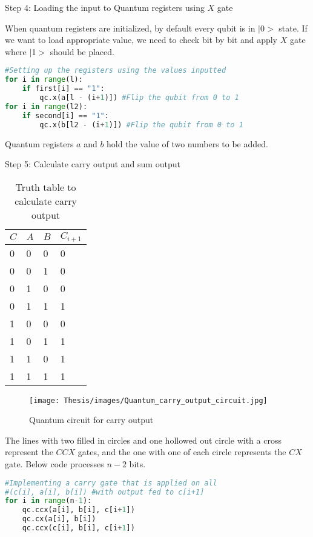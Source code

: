 \documentclass{cpp}
\begin{document}
\newpage
Step 4: Loading the input to Quantum registers using $X$ gate

When quantum registers are initialized, by default every qubit is in $|$0$>$ state. If we want to load appropriate value, we need to check bit by bit and apply $X$ gate where $|$1$>$ should be placed. 

\begin{lstlisting}[language=Python]
#Setting up the registers using the values inputted
for i in range(l):
    if first[i] == "1":
        qc.x(a[l - (i+1)]) #Flip the qubit from 0 to 1
for i in range(l2):
    if second[i] == "1":
        qc.x(b[l2 - (i+1)]) #Flip the qubit from 0 to 1
\end{lstlisting}

Quantum registers $a$ and $b$ hold the value of two numbers to be added. 

Step 5: Calculate carry output and sum output

\begin{table}[h]
\centering
\caption{Truth table to calculate carry output}
\begin{tabular}{llll}
\hline
$C$ &
$A$ &
$B$ &
$C_{i+1}$ \\
\hline
0 &
0 &
0 &
0 \\
0 &
0 &
1 &
0 \\
0 &
1 &
0 &
0 \\
0 &
1 &
1 &
1 \\
1 &
0 &
0 &
0 \\
1 &
0 &
1 &
1 \\
1 &
1 &
0 &
1 \\
1 &
1 &
1 &
1 \\
\hline
\end{tabular}
\label{table:table3}
\end{table}

\newpage
\begin{figure*}[htp]
    \centering
    \texttt{[image: Thesis/images/Quantum\_carry\_output\_circuit.jpg]}
    \caption{Quantum circuit for carry output}
    \label{fig:figure17}
\end{figure*}

The lines with two filled in circles and one hollowed out circle with a cross represent the $CCX$ gates, and the one with one of each circle represents the $CX$ gate. Below code processes $n-2$ bits.

\begin{lstlisting}[language=Python]
#Implementing a carry gate that is applied on all 
#(c[i], a[i], b[i]) #with output fed to c[i+1]
for i in range(n-1):
    qc.ccx(a[i], b[i], c[i+1])
    qc.cx(a[i], b[i])
    qc.ccx(c[i], b[i], c[i+1])
\end{lstlisting}
\end{document}
